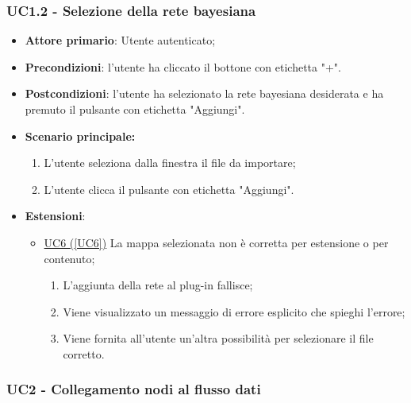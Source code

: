 \subsubsection{UC1.2 - Selezione della rete bayesiana}\label{UC1.2}
\begin{itemize}
	\item \textbf{Attore primario}: Utente autenticato;
	\item \textbf{Precondizioni}: l'utente ha cliccato il bottone con etichetta "+".
	\item \textbf{Postcondizioni}: l'utente ha selezionato la rete bayesiana desiderata e ha premuto il pulsante con etichetta "Aggiungi".
	\item \textbf{Scenario principale:}
	\begin{enumerate}
		\item L'utente seleziona dalla finestra il file da importare;
		\item L'utente clicca il pulsante con etichetta "Aggiungi".
	\end{enumerate}
	\item \textbf{Estensioni}:
	\begin{itemize}
		\item \hyperref[UC6]{UC6 (\ref*{UC6})} La mappa selezionata non è corretta per estensione o per contenuto;
		\begin{enumerate}
			\item L'aggiunta della rete al plug-in fallisce;
			\item Viene visualizzato un messaggio di errore esplicito che spieghi l'errore;
			\item Viene fornita all'utente un'altra possibilità per selezionare il file corretto.
		\end{enumerate}
	\end{itemize}
\end{itemize}

\pagebreak

\subsubsection{UC2 - Collegamento nodi al flusso dati}\label{UC2}

